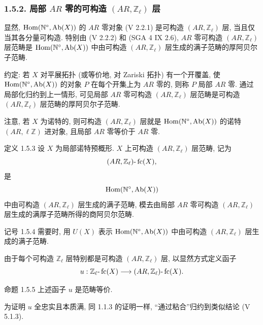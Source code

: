 \subsubsection*{1.5.2. 局部 \(AR\) 零的可构造 \((AR,\mathbb Z_\ell)\) 层}

显然, \(\operatorname{Hom}(\mathbb N^\circ,\operatorname{Ab}(X))\) 的 \(AR\) 零对象 (V 2.2.1) 是可构造 \((AR,\mathbb Z_\ell)\) 层, 当且仅当其各分量可构造. 特别由 (V 2.2.2) 和 (SGA 4 IX 2.6), \(AR\) 零可构造 \((AR,\mathbb Z_\ell)\) 层范畴是 \(\operatorname{Hom}(\mathbb N^\circ,\operatorname{Ab}(X))\) 中由可构造 \((AR,\mathbb Z_\ell)\) 层生成的满子范畴的厚阿贝尔子范畴.

约定: 若 \(X\) 对平展拓扑 (或等价地, 对 Zariski 拓扑) 有一个开覆盖, 使 \(\operatorname{Hom}(\mathbb N^\circ,\operatorname{Ab}(X))\) 的对象 \(P\) 在每个开集上为 \(AR\) 零的, 则称 \(P\) 局部 \(AR\) 零. 通过局部化归约到上一情形, 可见局部 \(AR\) 零可构造 \((AR,\mathbb Z_\ell)\) 层范畴是可构造 \((AR,\mathbb Z_\ell)\) 层范畴的厚阿贝尔子范畴.

注意, 若 \(X\) 为诺特的, 则可构造 \((AR,\mathbb Z_\ell)\) 层就是 \(\operatorname{Hom}(\mathbb N^\circ,\operatorname{Ab}(X))\) 的诺特 \((AR,\ell\mathbb Z)\) 进对象, 且局部 \(AR\) 零等价于 \(AR\) 零.

\begin{statement}{定义 1.5.3}
设 \(X\) 为局部诺特预概形. \(X\) 上可构造 \((AR,\mathbb Z_\ell)\) 层范畴, 记为
\[
(AR,\mathbb Z_\ell)\text{-}\operatorname{fc}(X),
\]
是
\[
\operatorname{Hom}(\mathbb N^\circ,\operatorname{Ab}(X))
\]
中由可构造 \((AR,\mathbb Z_\ell)\) 层生成的满子范畴, 模去由局部 \(AR\) 零可构造 \((AR,\mathbb Z_\ell)\) 层生成的满厚子范畴所得的商阿贝尔范畴.
\end{statement}

\begin{statement}{记号 1.5.4}
需要时, 用 \(U(X)\) 表示 \(\operatorname{Hom}(\mathbb N^\circ,\operatorname{Ab}(X))\) 中由可构造 \((AR,\mathbb Z_\ell)\) 层生成的满子范畴.
\end{statement}

由于每个可构造 \(\mathbb Z_\ell\) 层特别都是可构造 \((AR,\mathbb Z_\ell)\) 层, 以显然方式定义函子
\[
u:\mathbb Z_\ell\text{-}\operatorname{fc}(X)\longrightarrow (AR,\mathbb Z_\ell)\text{-}\operatorname{fc}(X).
\]

\begin{statement}{命题 1.5.5}
上述函子 \(u\) 是范畴等价.
\end{statement}

\begin{prooftext}[证明]
为证明 \(u\) 全忠实且本质满, 同 1.1.3 的证明一样, ``通过粘合''归约到类似结论 (V 5.1.3).
\end{prooftext}

